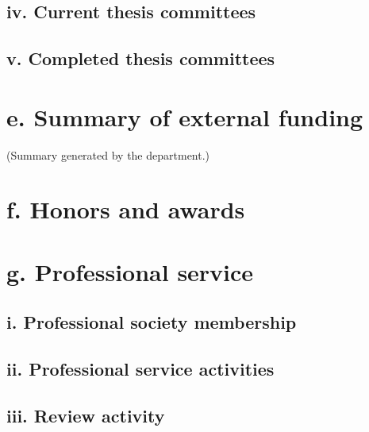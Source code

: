 \documentclass{article}
\begin{document}


\subsection*{iv. Current thesis committees}



\subsection*{v. Completed thesis committees}




\section*{e. Summary of external funding}

(Summary generated by the department.)


\section*{f. Honors and awards}




\section*{g. Professional service}

\subsection*{i. Professional society membership}



\subsection*{ii. Professional service activities}



\subsection*{iii. Review activity}
\end{document}
